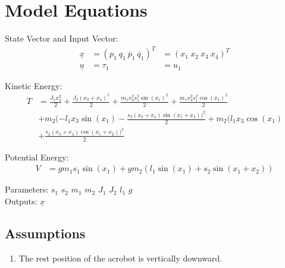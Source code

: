 \documentclass[10pt,a4paper]{article}
\begin{document}
	\begin{tabular}{ll}

	\end{tabular}
	
	
	\section{Model Equations} %
	
	State Vector and Input Vector:
	\begin{align*}
		\underline{x} &= (p_1 \ q_1 \ \dot{p_1} \ \dot{q_1})^T &= (x_1 \ x_2 \ x_3 \ x_4)^T \\
		\underline{u} &= \tau_1 &= u_1
	\end{align*}
	
	\noindent Kinetic Energy:			
	\begin{subequations}
	\begin{align*}
		T &= \frac{J_1x_3^2}{2} + \frac{J_2(x_3 + x_4)^2}{2} + \frac{m_1x_3^2s_1^2 \sin(x_1)^2}{2} + \frac{m_1x_3^2s_1^2 \cos(x_1)^2}{2} \\
		&+ m_2(-l_1x_3 \sin(x_1) - \frac{s_2(x_3 + x_4) \sin(x_1 + x_2))^2}{2} + m_2(l_1x_3 \cos(x_1) \\
		&+ \frac{s_2(x_3 + x_4) \cos(x_1 + x_2))^2}{2}
	\end{align*}
	\end{subequations}
	
	\noindent Potential Energy:			
	\begin{subequations}
	\begin{align*}
		V &= gm_1s_1\sin(x_1) + gm_2(l_1\sin(x_1) + s_2\sin(x_1 + x_2))
	\end{align*}
	\end{subequations}

	\noindent
	Parameters: $s_1$ $s_2$ $m_1$ $m_2$ $J_1$ $J_2$ $l_1$ $g$ %
	\\
	Outputs: $\underline{x}$ %
	
	
	\subsection{Assumptions} %
		\begin{enumerate} %
			\item The rest position of the acrobot is vertically downward.  
		\end{enumerate}
	
\end{document}
